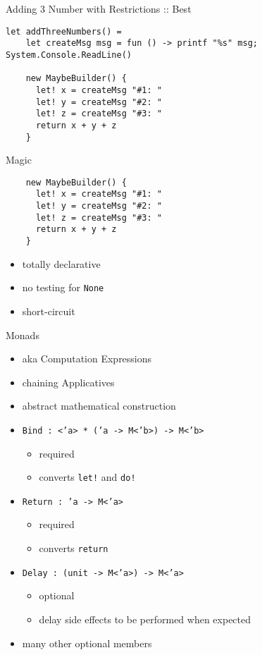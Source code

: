 \documentclass{beamer}
\begin{document}
\begin{frame}[fragile]{Adding 3 Number with Restrictions :: Best}
  \tiny
  \begin{verbatim}
let addThreeNumbers() =
    let createMsg msg = fun () -> printf "%s" msg; System.Console.ReadLine()

    new MaybeBuilder() {
      let! x = createMsg "#1: "
      let! y = createMsg "#2: "
      let! z = createMsg "#3: "
      return x + y + z
    }
  \end{verbatim}
\end{frame}

\begin{frame}[fragile]{Magic}
  \begin{verbatim}
    new MaybeBuilder() {
      let! x = createMsg "#1: "
      let! y = createMsg "#2: "
      let! z = createMsg "#3: "
      return x + y + z
    }
  \end{verbatim}
  \begin{itemize}[<+->]
    \item totally declarative
    \item no testing for \texttt{None}
    \item short-circuit
  \end{itemize}
\end{frame}

\begin{frame}{Monads}
  \begin{itemize}[<+->]
    \item aka Computation Expressions
    \item chaining Applicatives
    \item abstract mathematical construction
    \item \texttt{Bind : <'a> * ('a -> M<'b>) -> M<'b>}
    \begin{itemize}
      \item required
      \item converts \texttt{let!} and \texttt{do!}
    \end{itemize}
    \item \texttt{Return : 'a -> M<'a>}
    \begin{itemize}
      \item required
      \item converts \texttt{return}
    \end{itemize}
    \item \texttt{Delay : (unit -> M<'a>) -> M<'a>}
    \begin{itemize}
      \item optional
      \item delay side effects to be performed when expected
    \end{itemize}
    \item many other optional members
  \end{itemize}
\end{frame}
\end{document}
